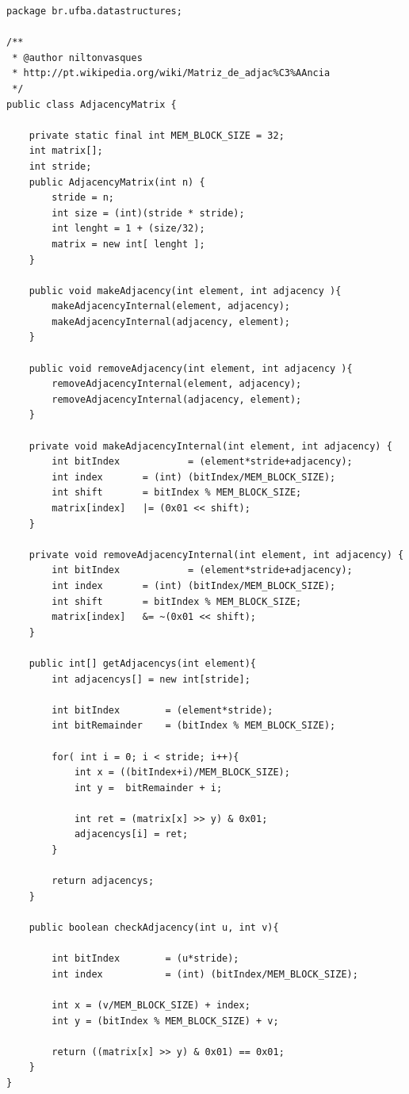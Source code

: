 \documentclass[a4paper,12pt]{article}
\begin{document}
\begin{lstlisting}[title=Implementação da Matriz de Adjacências Binária]
package br.ufba.datastructures;

/**
 * @author niltonvasques
 * http://pt.wikipedia.org/wiki/Matriz_de_adjac%C3%AAncia
 */
public class AdjacencyMatrix {

	private static final int MEM_BLOCK_SIZE = 32;
	int matrix[];
	int stride;
	public AdjacencyMatrix(int n) {
		stride = n;
		int size = (int)(stride * stride);
		int lenght = 1 + (size/32);
		matrix = new int[ lenght ];	
	}

	public void makeAdjacency(int element, int adjacency ){
		makeAdjacencyInternal(element, adjacency);
		makeAdjacencyInternal(adjacency, element);  
	}

	public void removeAdjacency(int element, int adjacency ){
		removeAdjacencyInternal(element, adjacency);
		removeAdjacencyInternal(adjacency, element);  
	}

	private void makeAdjacencyInternal(int element, int adjacency) {
		int bitIndex			= (element*stride+adjacency);
		int index 		= (int) (bitIndex/MEM_BLOCK_SIZE);
		int shift 		= bitIndex % MEM_BLOCK_SIZE;
		matrix[index] 	|= (0x01 << shift);
	}

	private void removeAdjacencyInternal(int element, int adjacency) {
		int bitIndex			= (element*stride+adjacency);
		int index 		= (int) (bitIndex/MEM_BLOCK_SIZE);
		int shift 		= bitIndex % MEM_BLOCK_SIZE;
		matrix[index] 	&= ~(0x01 << shift);
	}

	public int[] getAdjacencys(int element){
		int adjacencys[] = new int[stride];

		int bitIndex		= (element*stride);
		int bitRemainder	= (bitIndex % MEM_BLOCK_SIZE);

		for( int i = 0; i < stride; i++){
			int x = ((bitIndex+i)/MEM_BLOCK_SIZE);
			int y =  bitRemainder + i;

			int ret = (matrix[x] >> y) & 0x01;
			adjacencys[i] = ret;		
		}		

		return adjacencys;
	}

	public boolean checkAdjacency(int u, int v){

		int bitIndex		= (u*stride);
		int index 			= (int) (bitIndex/MEM_BLOCK_SIZE);

		int x = (v/MEM_BLOCK_SIZE) + index;
		int y = (bitIndex % MEM_BLOCK_SIZE) + v;

		return ((matrix[x] >> y) & 0x01) == 0x01;
	}
}
\end{lstlisting}




\end{document}

